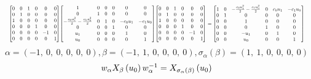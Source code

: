\documentclass[11pt]{article}
\theoremstyle{definition}
\begin{document}
\[
\scaletoalign{\textwidth}{{\left[\begin{matrix}0 & 0 & 1 & 0 & 0 & 0\\0 & 1 & 0 & 0 & 0 & 0\\1 & 0 & 0 & 0 & 0 & 0\\0 & 0 & 0 & 1 & 0 & 0\\0 & 0 & 0 & 0 & -1 & 0\\0 & 0 & 0 & 0 & 0 & 1\end{matrix}\right]} {\left[\begin{matrix}1 & 0 & 0 & 0 & 0 & 0\\0 & 1 & 0 & 0 & 0 & 0\\- \frac{c_{0} u_{1}^{2}}{2} - \frac{c_{1} u_{0}^{2}}{2} & 0 & 1 & 0 & - c_{0} u_{1} & - c_{1} u_{0}\\0 & 0 & 0 & 1 & 0 & 0\\u_{1} & 0 & 0 & 0 & 1 & 0\\u_{0} & 0 & 0 & 0 & 0 & 1\end{matrix}\right]} {\left[\begin{matrix}0 & 0 & 1 & 0 & 0 & 0\\0 & 1 & 0 & 0 & 0 & 0\\1 & 0 & 0 & 0 & 0 & 0\\0 & 0 & 0 & 1 & 0 & 0\\0 & 0 & 0 & 0 & -1 & 0\\0 & 0 & 0 & 0 & 0 & 1\end{matrix}\right]} = {\left[\begin{matrix}1 & 0 & - \frac{c_{0} u_{1}^{2}}{2} - \frac{c_{1} u_{0}^{2}}{2} & 0 & c_{0} u_{1} & - c_{1} u_{0}\\0 & 1 & 0 & 0 & 0 & 0\\0 & 0 & 1 & 0 & 0 & 0\\0 & 0 & 0 & 1 & 0 & 0\\0 & 0 & - u_{1} & 0 & 1 & 0\\0 & 0 & u_{0} & 0 & 0 & 1\end{matrix}\right]}}
\]
\[
\alpha = \left( -1, \  0, \  0, \  0, \  0, \  0\right), \beta = \left( -1, \  1, \  0, \  0, \  0, \  0\right), \sigma_{\alpha}(\beta) = \left( 1, \  1, \  0, \  0, \  0, \  0\right)
\]
\[
\scaletoalign{\textwidth}{w_{\alpha} X_{\beta}\left(u_{0}\right) w_{\alpha}^{-1} = X_{\sigma_{\alpha}\left(\beta\right)}\left(u_{0}\right)}
\]
\end{document}
